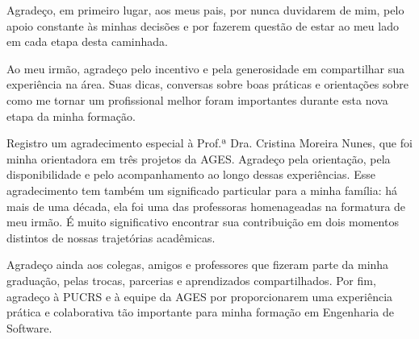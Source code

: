 \begin{agradecimentos}
  Agradeço, em primeiro lugar, aos meus pais, por nunca duvidarem de mim, pelo
  apoio constante às minhas decisões e por fazerem questão de estar ao meu lado
  em cada etapa desta caminhada.

  Ao meu irmão, agradeço pelo incentivo e pela generosidade em compartilhar sua
  experiência na área. Suas dicas, conversas sobre boas práticas e orientações
  sobre como me tornar um profissional melhor foram importantes durante esta nova
  etapa da minha formação.

  Registro um agradecimento especial à Prof.ª Dra. Cristina Moreira Nunes, que
  foi minha orientadora em três projetos da AGES. Agradeço pela
  orientação, pela disponibilidade e pelo acompanhamento ao longo dessas
  experiências. Esse agradecimento tem também um significado particular para a
  minha família: há mais de uma década, ela foi uma das professoras homenageadas
  na formatura de meu irmão. É muito significativo encontrar sua contribuição em
  dois momentos distintos de nossas trajetórias acadêmicas.

  Agradeço ainda aos colegas, amigos e professores que fizeram parte da minha
  graduação, pelas trocas, parcerias e aprendizados compartilhados. Por fim,
  agradeço à PUCRS e à equipe da AGES por proporcionarem uma experiência prática
  e colaborativa tão importante para minha formação em Engenharia de Software.
\vfill
\end{agradecimentos}
